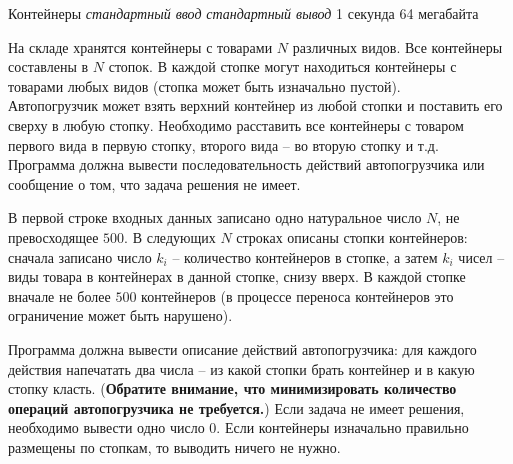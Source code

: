 \begin{problem}%
{Контейнеры}%
{\textsl{стандартный ввод}}%
{\textsl{стандартный вывод}}%
{1 секунда}%
{64 мегабайта}%
{}

На складе хранятся контейнеры с товарами $N$ различных видов. Все контейнеры составлены в $N$ стопок. В каждой стопке могут находиться контейнеры с товарами любых видов (стопка может быть изначально пустой).\\

Автопогрузчик может взять верхний контейнер из любой стопки и поставить его сверху в любую стопку. Необходимо расставить все контейнеры с товаром первого вида в первую стопку, второго вида – во вторую стопку и т.д.\\

Программа должна вывести последовательность действий автопогрузчика или сообщение о том, что задача решения не имеет.

\InputFile

В первой строке входных данных записано одно натуральное число $N$, не превосходящее $500$. В следующих $N$ строках описаны стопки контейнеров: сначала записано число $k_i$ – количество контейнеров в стопке, а затем $k_i$ чисел – виды товара в контейнерах в данной стопке, снизу вверх. В каждой стопке вначале не более $500$ контейнеров (в процессе переноса контейнеров это ограничение может быть нарушено).

\OutputFile

Программа должна вывести описание действий автопогрузчика: для каждого действия напечатать два числа – из какой стопки брать контейнер и в какую стопку класть. (\textbf{Обратите внимание, что минимизировать количество операций автопогрузчика не требуется.}) Если задача не имеет решения, необходимо вывести одно число $0$. Если контейнеры изначально правильно размещены по стопкам, то  выводить ничего не нужно.

\Examples

\begin{example}
%
\end{example}
\end{problem}
